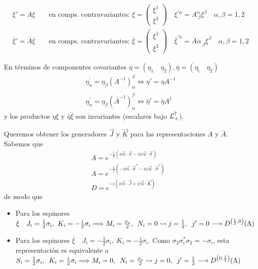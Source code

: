 \begin{subequations}
\begin{flalign}
&\xi'=A\xi \qquad \text{en comps. contravariantes:  } \xi= \begin{pmatrix}
\xi^1 \\ \xi^2
\end{pmatrix}\quad \xi^{\prime\alpha}=A^\alpha_{\ \beta} \xi^\beta\quad \alpha,\beta=1,2\\
&\bar{\xi}'=\bar{A}\bar{\xi} \qquad \text{en comps. contravariantes:  } \bar{\xi}= \begin{pmatrix}
\xi^{\dot{1}} \\ \xi^{\dot{2}}
\end{pmatrix}\quad  \bar{\xi}^{\prime\dot{\alpha}}=\bar{A}{\dot{\alpha}}_{\ \dot{\beta}} \xi^{\dot{\beta}}\quad \alpha,\beta=1,2
\end{flalign}
\end{subequations}

En términos de componentes covariantes $\eta=\left(\eta_{1} \quad \eta_{2}\right), \bar{\eta}=\left(\eta_{\mathrm{i}} \quad \eta_{\dot{2}}\right)$
\begin{subequations}
\begin{flalign}
&\eta_{\alpha}^{\prime}=\eta_{\beta}\left(A^{-1}\right)_{\alpha}^{\beta} \Longleftrightarrow \eta'=\eta A^{-1}\\
&\eta_{\dot{\alpha}}^{\prime}=\eta_{\dot{\beta}}\left(\bar{A}^{-1}\right)_{\dot{\alpha}}^{\dot{\beta}}\Longleftrightarrow \bar{\eta}'=\bar{\eta}A^\dagger
\end{flalign}
\end{subequations}
y los productos $\eta\xi$ y $\bar{\eta} \bar{\xi}$ son invariantes (escalares bajo $\mathcal{L}_+^\uparrow$). \medskip


Queremos obtener los generadores $\vec{J}$ y $\vec{K}$ para las representaciones $A$ y $\bar{A}$. Sabemos que 
\begin{gather}
A=e^{-\frac{i}{2}(\phi \vec{n}\cdot \vec{\sigma}-i\psi \vec{u}\cdot\vec{\sigma})}\\
A=e^{-\frac{i}{2}(-\phi \vec{n}\cdot \vec{\sigma}^*-i\psi \vec{u}\cdot\vec{\sigma}^*)}\\
D=e^{-i(\phi \vec{n}\cdot \vec{J}+\psi \vec{u}\cdot \vec{K})}
\end{gather}
de modo que
\begin{itemize}
\item Para los espinores $\xi\quad J_i=\frac{1}{2}\sigma_i,\ K_i=-\frac{i}{2}\sigma_i\Longrightarrow M_i=\frac{\sigma_i}{2},\enskip N_i=0\leadsto j=\frac{1}{2},\enskip j'=0\longrightarrow D^{\left(\frac{1}{2},0\right)}(\Lambda)$
\item Para los espinores $\bar{\xi}\quad J_i=-\frac{1}{2}\sigma_i,\ K_i=-\frac{i}{2}\sigma_i$. Como $\sigma_2\sigma_i^*\sigma_2=-\sigma_i$, esta representación es equivalente a $S_i=\frac{1}{2}\sigma_i,\enskip K_i=\frac{i}{2}\sigma_i\Longrightarrow M_i=0,\enskip N_i=\frac{\sigma_i}{2}\leadsto j=0,\enskip j'=\frac{1}{2}\longrightarrow D^{\left(0,\frac{1}{2}\right)}(\Lambda)$
\end{itemize}


